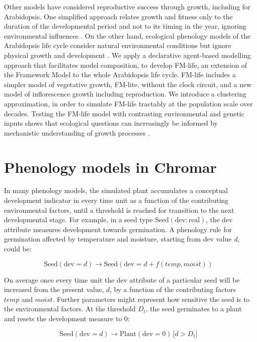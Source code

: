 \documentclass[phd]{infthesis}
\newcommand{\mr}[1]{\mathrm{#1}}
\newcommand{\ar}[2]{\mr{#1} \! = \! {#2}}
\begin{document}
Other models have considered reproductive success through growth, including for
Arabidopsis. One simplified approach relates growth and fitness only to the
duration of the developmental period and not to its timing in the year, ignoring
environmental influences \citep{prusinkiewicz_evolution_2007}. On the other
hand, ecological phenology models of the Arabidopsis life cycle consider natural
environmental conditions but ignore physical growth and development
\citep{chuine_phenology_2001, chuine_why_2010,burghardt_modeling_2015}. We apply
a declarative agent-based modelling approach that facilitates model composition,
to develop FM-life, an extension of the Framework Model to the whole Arabidopsis
life cycle. FM-life includes a simpler model of vegetative growth, FM-lite,
without the clock circuit, and a new model of inflorescence growth including
reproduction. We introduce a clustering approximation, in order to simulate
FM-life tractably at the population scale over decades. Testing the FM-life
model with contrasting environmental and genetic inputs shows that ecological
questions can increasingly be informed by mechanistic understanding of growth
processes \citep{millar_intracellular_2016, doebeli_towards_2017}.

\section{Phenology models in Chromar}
\label{phenology-models-in-chromar}
In many phenology models, the simulated plant accumulates a conceptual
development indicator in every time unit as a function of the
contributing environmental factors, until a threshold is reached for
transition to the next developmental stage. For example, in a seed type
\(\mr{Seed}(\mr{dev}:\mr{real})\), the dev attribute measures
development towards germination. A phenology rule for germination
affected by temperature and moisture, starting from dev value \emph{d},
could be:

\[\mr{Seed}(\ar{dev}{d}) \xrightarrow{} \mr{Seed}(\ar{dev}{d + f(temp,moist)}) \]

On average once every time unit the $\mr{dev}$ attribute of a
particular seed will be increased from the present value, \(d\), by a
function of the contributing factors $temp$ and
$moist$. Further parameters might represent how sensitive the
seed is to the environmental factors. At the threshold
$D_t$, the seed germinates to a plant and resets the
development measure to 0:

\[\mr{Seed}(\ar{dev}{d}) \xrightarrow{} \mr{Plant}(\ar{dev}{0}) \, \lbrack d > D_{t}\rbrack \]
\end{document}
